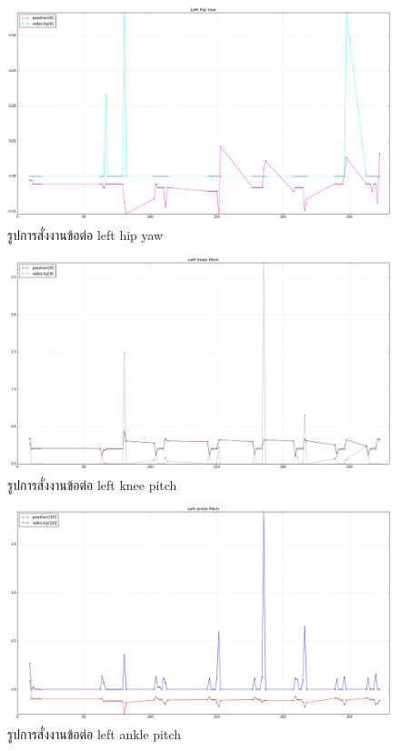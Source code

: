 \begin{figure}[!ht]
  \centering
  \includegraphics[width=1.0\linewidth]{chapter4/images/left_hip_yaw.png}
  \caption{รูปการสั่งงานข้อต่อ left hip yaw}
  \label{fig:left_hip_yaw}
\end{figure}

\begin{figure}[!ht]
  \centering
  \includegraphics[width=1.0\linewidth]{chapter4/images/left_knee_pitch.png}
  \caption{รูปการสั่งงานข้อต่อ left knee pitch}
  \label{fig:left_knee_pitch}
\end{figure}
\clearpage

\begin{figure}[!ht]
  \centering
  \includegraphics[width=1.0\linewidth]{chapter4/images/left_ankle_pitch.png}
  \caption{รูปการสั่งงานข้อต่อ left ankle pitch}
  \label{fig:left_ankle_pitch}
\end{figure}

